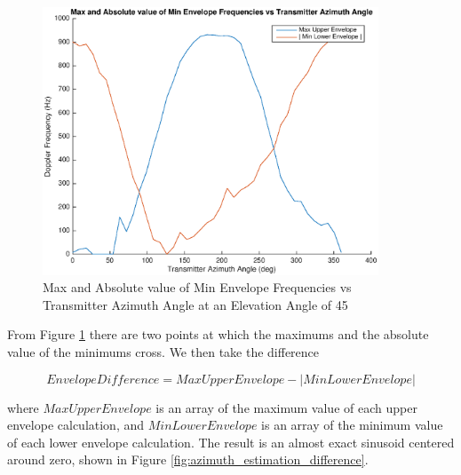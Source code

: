 \begin{figure}
	\begin{center}
		\includegraphics[width=10cm]{images/results/Azimuth_angle_estimation_max_vs_absMin.eps}
		\caption{Max and Absolute value of Min Envelope Frequencies vs Transmitter Azimuth Angle at an Elevation Angle of 45\textdegree}
		\label{fig:azimuth_estimation_max_vs_absMin}
	\end{center}
\end{figure}

From Figure \ref{fig:azimuth_estimation_max_vs_absMin} there are two points at which the maximums and the absolute value of the minimums cross. We then take the difference 

\begin{equation}
	 Envelope Difference = Max Upper Envelope - | Min Lower Envelope |
	 \label{eqn:difference}
\end{equation}

where $Max Upper Envelope$ is an array of the maximum value of each upper envelope calculation, and $Min Lower Envelope$ is an array of the minimum value of each lower envelope calculation. The result is an almost exact sinusoid centered around zero, shown in Figure \ref{fig:azimuth_estimation_difference}.

